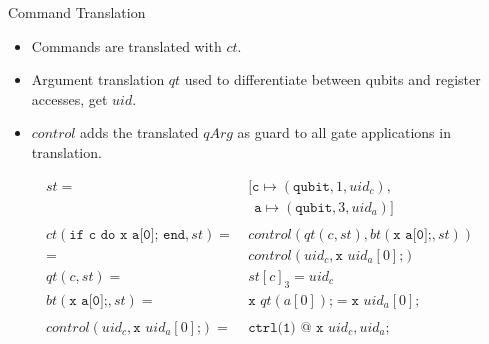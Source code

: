 \begin{frame}{Command Translation}
    \begin{itemize}
        \item Commands are translated with $ct$.
        \item Argument translation $qt$ used to differentiate between qubits and register accesses, get $uid$.
        \item $control$ adds the translated $qArg$ as guard to all gate applications in translation.  
    \end{itemize}
    \begin{align*}
        st =& \ [ \texttt{c} \mapsto (\texttt{qubit}, 1, uid_c),\\
            & \ \ \ \texttt{a} \mapsto (\texttt{qubit}, 3, uid_a)]\\
            &\\
        ct(\texttt{if c do x a[0]; end}, st) =& \ control(qt(c, st), bt(\texttt{x a[0];}, st))\\
                                             =& \ control(uid_c, \texttt{x } uid_a[0] \texttt{;})\\
        qt(c, st) =& \ st[c]_3 = uid_c\\
        bt(\texttt{x a[0];}, st) =& \ \texttt{x } qt(a[0]) \texttt{;} = \texttt{x } uid_a[0] \texttt{;}\\
            &\\
        control(uid_c, \texttt{x } uid_a[0] \texttt{;}) =& \ \texttt{ctrl(1) @ x } uid_c, uid_a \texttt{;} 
    \end{align*}
\end{frame}

